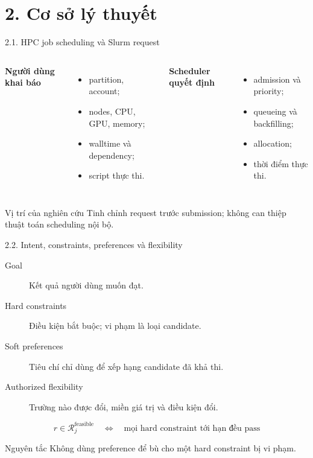 \section{2. Cơ sở lý thuyết}

\begin{frame}[t]{2.1. HPC job scheduling và Slurm request}
\small
\begin{columns}[T]
\textbf{Người dùng khai báo}
\begin{itemize}
  \item partition, account;
  \item nodes, CPU, GPU, memory;
  \item walltime và dependency;
  \item script thực thi.
\end{itemize}
\textbf{Scheduler quyết định}
\begin{itemize}
  \item admission và priority;
  \item queueing và backfilling;
  \item allocation;
  \item thời điểm thực thi.
\end{itemize}
\end{columns}
\begin{block}{Vị trí của nghiên cứu}
Tinh chỉnh request trước submission; không can thiệp thuật toán scheduling nội bộ.
\end{block}
\end{frame}

\begin{frame}[t]{2.2. Intent, constraints, preferences và flexibility}
\small
\begin{description}
  \item[Goal] Kết quả người dùng muốn đạt.
  \item[Hard constraints] Điều kiện bắt buộc; vi phạm là loại candidate.
  \item[Soft preferences] Tiêu chí chỉ dùng để xếp hạng candidate đã khả thi.
  \item[Authorized flexibility] Trường nào được đổi, miền giá trị và điều kiện đổi.
\end{description}
\[
r\in\mathcal{R}^{\mathrm{feasible}}_j
\quad\Longleftrightarrow\quad
\text{mọi hard constraint tới hạn đều pass}
\]
\begin{alertblock}{Nguyên tắc}
Không dùng preference để bù cho một hard constraint bị vi phạm.
\end{alertblock}
\end{frame}

